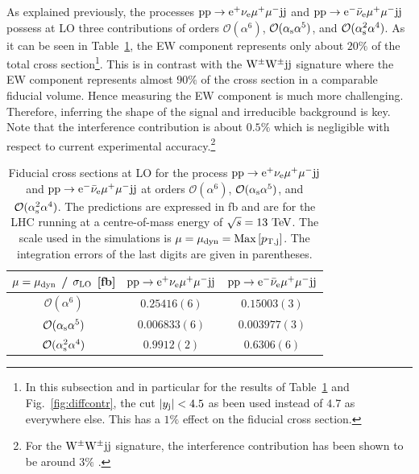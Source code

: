 \documentclass[11pt]{cernrep}
\begin{document}
As explained previously, the processes ${\rm p} {\rm p} \to {\rm e}^+  \nu_{\rm e}  \mu^+ \mu^- {\rm j} {\rm j}$  and ${\rm p} {\rm p} \to {\rm e}^-  \bar \nu_{\rm e}  \mu^+ \mu^- {\rm j} {\rm j}$
possess at LO three contributions of orders $\mathcal{O} (\alpha^6)$, $\mathcal{O} (\alpha_{\rm s}\alpha^5)$, and $\mathcal{O} (\alpha_{\rm s}^2\alpha^4)$.
As it can be seen in Table~\ref{table:xsectallLOdyn}, the EW component represents only about $20\%$ of the total cross section\footnote{In this subsection and in particular for the results of Table~\ref{table:xsectallLOdyn} and Fig.~\ref{fig:diffcontr}, the cut $|y_{\rm j}| < 4.5$ as been used instead of $4.7$ as everywhere else. This has a $1\%$ effect on the fiducial cross section.}.
This is in contrast with the ${\rm W}^\pm{\rm W}^\pm{\rm j}{\rm j}$ signature where the EW component represents almost $90\%$ of the cross section \cite{Biedermann:2017bss} in a comparable fiducial volume.
Hence measuring the EW component is much more challenging.
Therefore, inferring the shape of the signal and irreducible background is key.
Note that the interference contribution is about $0.5\%$ which is negligible with respect to current experimental accuracy.\footnote{For the ${\rm W}^\pm{\rm W}^\pm{\rm j}{\rm j}$ signature, the interference contribution has been shown to be around $3\%$ \cite{Biedermann:2017bss}.}

\begin{table}
\begin{center} 
\begin{tabular}{ c | c | c }
 $\mu = \mu_{\rm dyn}$ / $\sigma_{\rm LO}$ [fb] & ${\rm p} {\rm p} \to {\rm e}^+  \nu_{\rm e}  \mu^+ \mu^- {\rm j} {\rm j}$  & ${\rm p} {\rm p} \to {\rm e}^-  \bar \nu_{\rm e}  \mu^+ \mu^- {\rm j} {\rm j}$  \\
  \hline\hline
  $\mathcal{O} (\alpha^6)$                        & $0.25416(6)$  & $0.15003(3)$   \\
  $\mathcal{O} (\alpha_{\rm s}\alpha^5)$          & $0.006833(6)$ & $0.003977(3)$  \\
  $\mathcal{O} (\alpha_{\rm s}^2\alpha^4)$        & $0.9912(2)$   & $0.6306(6)$   \\
  \hline
\end{tabular}
\end{center}
\caption{
Fiducial cross sections at LO for the process ${\rm p}{\rm p}\to{\rm e}^+\nu_{\rm e}\mu^+\mu^-{\rm j}{\rm j}$ and ${\rm p}{\rm p}\to{\rm e}^-\bar\nu_{\rm e}\mu^+\mu^-{\rm j}{\rm j}$ at orders $\mathcal{O} (\alpha^6)$, $\mathcal{O} (\alpha_{\rm s}\alpha^5)$, and $\mathcal{O} (\alpha_{\rm s}^2\alpha^4)$.
The predictions are expressed in fb and are for the LHC running at a centre-of-mass energy of $\sqrt{s}=13 {\rm~TeV}$.
The scale used in the simulations is $\mu = \mu_{\rm dyn} = {\rm Max}\left[p_{\rm T, j}\right]$.
The integration errors of the last digits are given in parentheses.}
\label{table:xsectallLOdyn}
\end{table}
\end{document}
